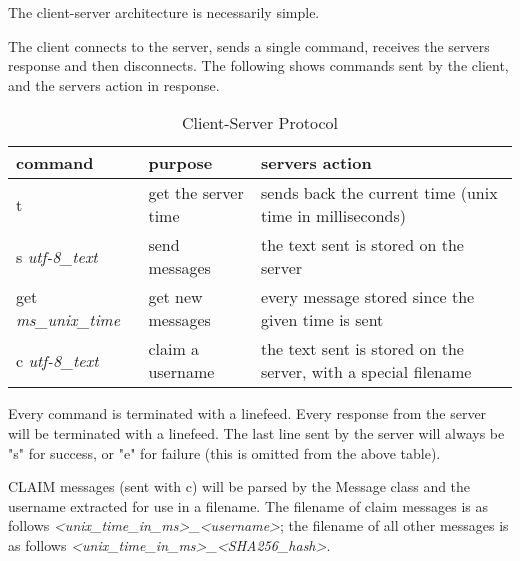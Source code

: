 The client-server architecture is necessarily simple.

The client connects to the server, sends a single command, receives the servers
response and then disconnects. The following shows commands sent by the client,
and the servers action in response.

\begin{table}[h]
    \centering
    \begin{tabular}{lll}
    command                     & purpose             & servers action\\ \hline
    t                           & get the server time & sends back the current time (unix time in milliseconds)\\
    s   \textit{utf-8\_text}    & send messages       & the text sent is stored on the server\\
    get \textit{ms\_unix\_time} & get new messages    & every message stored since the given time is sent\\
    c   \textit{utf-8\_text}    & claim a username    & the text sent is stored on the server, with a special filename\\
    \end{tabular}
    \caption{Client-Server Protocol}
\end{table}

Every command is terminated with a linefeed. Every response from the server will
be terminated with a linefeed. The last line sent by the server will always be
"s" for success, or "e" for failure (this is omitted from the above table).

CLAIM messages (sent with c) will be parsed by the Message class and the
username extracted for use in a filename. The filename of claim messages is as
follows
\textit{\textless unix\_time\_in\_ms\textgreater \_\textless username\textgreater};
the filename of all other messages is as follows
\textit{\textless unix\_time\_in\_ms\textgreater \_\textless SHA256\_hash\textgreater}.
